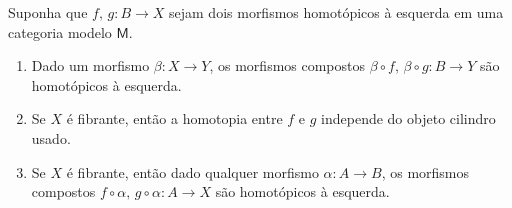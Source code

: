 \begin{prop}\label{prop:props_homotopia_esquerda}
  Suponha que $f,\,g : B \to X$ sejam dois morfismos homotópicos à esquerda em uma categoria modelo $\mathsf{M}$.

  \begin{enumerate}
  \item Dado um morfismo $\beta: X \to Y$, os morfismos compostos $\beta \circ f,\, \beta \circ g: B \to Y$ são homotópicos à esquerda.
    
  \item Se $X$ é fibrante, então a homotopia entre $f$ e $g$ independe do objeto cilindro usado.
    
  \item Se $X$ é fibrante, então dado qualquer morfismo $\alpha: A \to B$, os morfismos compostos $f \circ \alpha,\, g \circ \alpha: A \to X$ são homotópicos à esquerda.
  \end{enumerate}
\end{prop}

